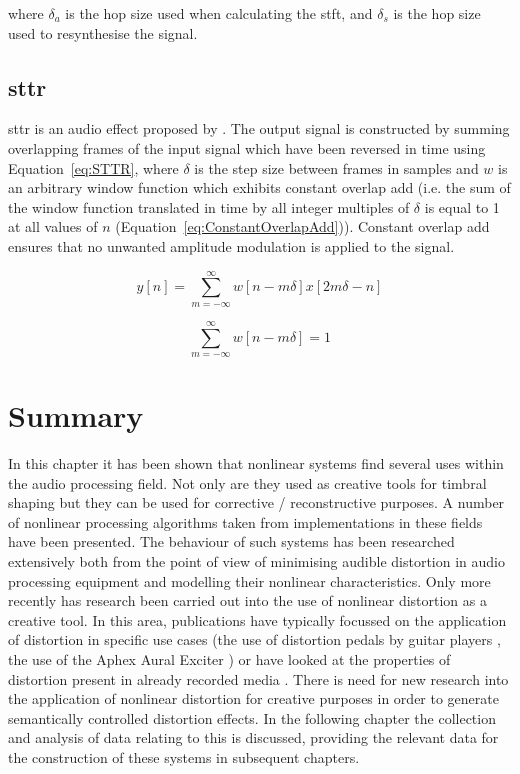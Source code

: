 		where $\delta_{a}$ is the hop size used when calculating the \acrshort{stft}, and $\delta_{s}$ is the hop
		size used to resynthesise the signal.

	\subsection{\acrlong{sttr}}
	\label{sec:Excitation-Methods-STTR}
		\acrfull{sttr} is an audio effect proposed by \citet{kim2014shorttime}. The output signal is constructed by
		summing overlapping frames of the input signal which have been reversed in time using
		Equation~\ref{eq:STTR}, where $\delta$ is the step size between frames in samples and $w$ is an arbitrary
		window function which exhibits constant overlap add (i.e. the sum of the window function translated in time
		by all integer multiples of $\delta$ is equal to 1 at all values of $n$
		(Equation~\ref{eq:ConstantOverlapAdd})).  Constant overlap add ensures that no unwanted amplitude
		modulation is applied to the signal.

		\begin{equation}
			y[n] = \sum_{m = -\infty}^{\infty} w[n - m\delta]x[2m\delta - n]
			\label{eq:STTR}
		\end{equation}

		\begin{equation}
			\sum_{m = -\infty}^{\infty} w[n - m\delta] = 1
			\label{eq:ConstantOverlapAdd}
		\end{equation}

\section{Summary}
\label{sec:Excitation-Summary}
	In this chapter it has been shown that nonlinear systems find several uses within the audio processing field. Not
	only are they used as creative tools for timbral shaping but they can be used for corrective / reconstructive
	purposes. A number of nonlinear processing algorithms taken from implementations in these fields have been
	presented. The behaviour of such systems has been researched extensively both from the point of view of minimising
	audible distortion in audio processing equipment and modelling their nonlinear characteristics. Only more recently
	has research been carried out into the use of nonlinear distortion as a creative tool. In this area, publications
	have typically focussed on the application of distortion in specific use cases (the use of distortion pedals by
	guitar players \citep{tsumoto2016the}, the use of the Aphex Aural Exciter \citep{shekar2013modeling}) or have
	looked at the properties of distortion present in already recorded media \citep{wilson2014characterisation}. There
	is need for new research into the application of nonlinear distortion for creative purposes in order to generate
	semantically controlled distortion effects. In the following chapter the collection and analysis of data relating
	to this is discussed, providing the relevant data for the construction of these systems in subsequent chapters.
